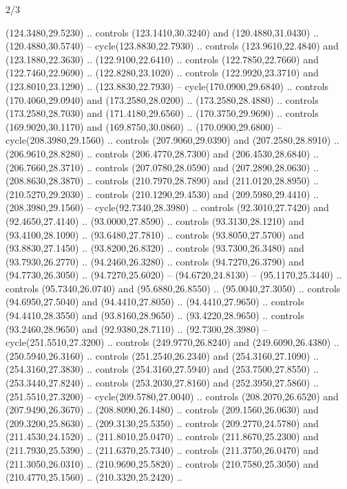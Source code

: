 \begin{flagdescription}{2/3}
\begin{scope}[xshift=0.5\flaglength,yshift=0.5\flagwidth,scale=\stretchfactor]
\begin{scope}[scale=0.001645\flagwidth,yshift=65mm,xshift=-63mm]
\begin{scope}[y=0.80pt, x=0.80pt, yscale=-1,]
\begin{scope}[cm={{1.33333,0.0,0.0,1.33333,(0.0,1e-05)}}]
  (124.3480,29.5230) .. controls (123.1410,30.3240) and (120.4880,31.0430) ..
  (120.4880,30.5740) -- cycle(123.8830,22.7930) .. controls (123.9610,22.4840)
  and (123.1880,22.3630) .. (122.9100,22.6410) .. controls (122.7850,22.7660)
  and (122.7460,22.9690) .. (122.8280,23.1020) .. controls (122.9920,23.3710)
  and (123.8010,23.1290) .. (123.8830,22.7930) -- cycle(170.0900,29.6840) ..
  controls (170.4060,29.0940) and (173.2580,28.0200) .. (173.2580,28.4880) ..
  controls (173.2580,28.7030) and (171.4180,29.6560) .. (170.3750,29.9690) ..
  controls (169.9020,30.1170) and (169.8750,30.0860) .. (170.0900,29.6800) --
  cycle(208.3980,29.1560) .. controls (207.9060,29.0390) and (207.2580,28.8910)
  .. (206.9610,28.8280) .. controls (206.4770,28.7300) and (206.4530,28.6840) ..
  (206.7660,28.3710) .. controls (207.0780,28.0590) and (207.2890,28.0630) ..
  (208.8630,28.3870) .. controls (210.7970,28.7890) and (211.0120,28.8950) ..
  (210.5270,29.2030) .. controls (210.1290,29.4530) and (209.5980,29.4410) ..
  (208.3980,29.1560) -- cycle(92.7340,28.3980) .. controls (92.3010,27.7420) and
  (92.4650,27.4140) .. (93.0000,27.8590) .. controls (93.3130,28.1210) and
  (93.4100,28.1090) .. (93.6480,27.7810) .. controls (93.8050,27.5700) and
  (93.8830,27.1450) .. (93.8200,26.8320) .. controls (93.7300,26.3480) and
  (93.7930,26.2770) .. (94.2460,26.3280) .. controls (94.7270,26.3790) and
  (94.7730,26.3050) .. (94.7270,25.6020) -- (94.6720,24.8130) --
  (95.1170,25.3440) .. controls (95.7340,26.0740) and (95.6880,26.8550) ..
  (95.0040,27.3050) .. controls (94.6950,27.5040) and (94.4410,27.8050) ..
  (94.4410,27.9650) .. controls (94.4410,28.3550) and (93.8160,28.9650) ..
  (93.4220,28.9650) .. controls (93.2460,28.9650) and (92.9380,28.7110) ..
  (92.7300,28.3980) -- cycle(251.5510,27.3200) .. controls (249.9770,26.8240)
  and (249.6090,26.4380) .. (250.5940,26.3160) .. controls (251.2540,26.2340)
  and (254.3160,27.1090) .. (254.3160,27.3830) .. controls (254.3160,27.5940)
  and (253.7500,27.8550) .. (253.3440,27.8240) .. controls (253.2030,27.8160)
  and (252.3950,27.5860) .. (251.5510,27.3200) -- cycle(209.5780,27.0040) ..
  controls (208.2070,26.6520) and (207.9490,26.3670) .. (208.8090,26.1480) ..
  controls (209.1560,26.0630) and (209.3200,25.8630) .. (209.3130,25.5350) ..
  controls (209.2770,24.5780) and (211.4530,24.1520) .. (211.8010,25.0470) ..
  controls (211.8670,25.2300) and (211.7930,25.5390) .. (211.6370,25.7340) ..
  controls (211.3750,26.0470) and (211.3050,26.0310) .. (210.9690,25.5820) ..
  controls (210.7580,25.3050) and (210.4770,25.1560) .. (210.3320,25.2420) ..

\end{scope}
\end{scope}
\end{scope}
\end{scope}
\end{flagdescription}
